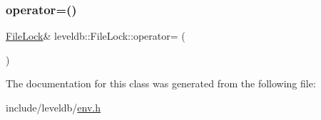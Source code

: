 \subsubsection{\texorpdfstring{operator=()}{operator=()}}
{\footnotesize\ttfamily \mbox{\hyperlink{classleveldb_1_1_file_lock}{File\+Lock}}\& leveldb\+::\+File\+Lock\+::operator= (\begin{DoxyParamCaption}\item[{const \mbox{\hyperlink{classleveldb_1_1_file_lock}{File\+Lock}} \&}]{ }\end{DoxyParamCaption})\hspace{0.3cm}{\ttfamily [delete]}}



The documentation for this class was generated from the following file\+:\begin{DoxyCompactItemize}
\item 
include/leveldb/\mbox{\hyperlink{env_8h}{env.\+h}}\end{DoxyCompactItemize}
